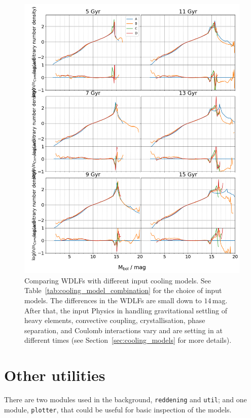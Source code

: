 \documentclass[fleqn,usenatbib]{rasti}
\begin{document}
\begin{figure}
    \centering
    \includegraphics[width=\textwidth]{fig_11_wdlf_compare_da_cooling_models.png}
    \caption{Comparing WDLFs with different input cooling models. See
    Table~\ref{tab:cooling_model_combination} for the choice of input models.
    The differences in the WDLFs are small down to $14$\,mag. After that, the
    input Physics in handling gravitational settling of heavy elements,
    convective coupling, crystallisation, phase separation, and Coulomb
    interactions vary and are setting in at different times (see
    Section~\ref{sec:cooling_models} for more details).
    }
    \label{fig:wdlf_compare_da_cooling_models}
\end{figure}


\section{Other utilities}
There are two modules used in the background, \texttt{reddening} and
\texttt{util}; and one module, \texttt{plotter}, that could be useful for
basic inspection of the models. 
\end{document}
